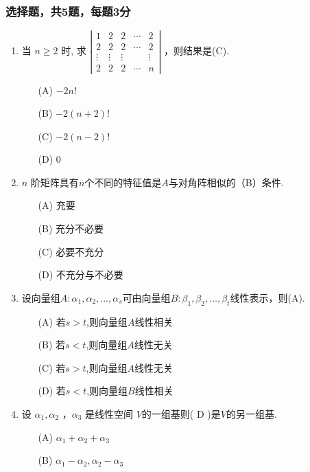 \subsubsection*{选择题，共5题，每题3分}

\begin{enumerate}
    \item 当 $n \geqslant 2$ 时, 求 $\left|\begin{array}{ccccc}1 & 2 & 2 & \cdots & 2 \\ 2 & 2 & 2 & \cdots & 2 \\ \vdots & \vdots & \vdots & & \vdots \\ 2 & 2 & 2 & \cdots & n\end{array}\right|$ ，则结果是(C).
    \begin{enumerate}
        \item[(A)] $-2 n!$ 
        \item[(B)] $-2(n+2)!$
        \item[(C)] $-2(n-2)!$
        \item[(D)]  0
    \end{enumerate}
    \item $n$ 阶矩阵具有$n$个不同的特征值是$A$与对角阵相似的（B）条件.
    \begin{enumerate}
        \item[(A)] 充要
        \item[(B)] 充分不必要
        \item[(C)] 必要不充分
        \item[(D)] 不充分与不必要
    \end{enumerate}
    \item 设向量组$A:\alpha_1,\alpha_2,\dots,\alpha_s$可由向量组$B:\beta_1,\beta_2,\dots,\beta_t$线性表示，则(A).
    \begin{enumerate}
        \item[(A)] 若$s>t$,则向量组$A$线性相关
        \item[(B)] 若$s<t$,则向量组$A$线性无关
        \item[(C)] 若$s>t$,则向量组$A$线性无关
        \item[(D)] 若$s<t$,则向量组$B$线性相关
    \end{enumerate}
    \item 设 $\alpha_1, \alpha_2$ ，$\alpha_3$ 是线性空间 $V$的一组基则( D )是$V$的另一组基.
    \begin{enumerate}
        \item[(A)] $\alpha_1+\alpha_2+\alpha_3$
        \item[(B)] $\alpha_1-\alpha_2, \alpha_2-\alpha_3$

\end{enumerate}
\end{enumerate}

